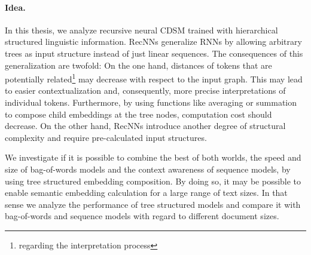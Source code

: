 \paragraph{Idea.}In this thesis, we analyze recursive neural \ac{CDSM} trained with hierarchical structured linguistic information. \acp{RecNN} \autocite{goller_learning_1996,socher_parsing_2011} generalize \acp{RNN} by allowing arbitrary trees as input structure instead of just linear sequences. The consequences of this generalization are twofold: On the one hand, distances of tokens that are potentially related\footnote{regarding the interpretation process} may decrease with respect to the input graph. This may lead to easier contextualization and, consequently, more precise interpretations of individual tokens. Furthermore, by using functions like averaging or summation to compose child embeddings at the tree nodes, computation cost should decrease. On the other hand, \acp{RecNN} introduce another degree of structural complexity and require pre-calculated input structures.%

We investigate if it is possible to combine the best of both worlds, the speed and size of bag-of-words models and the context awareness of sequence models, by using tree structured embedding composition. By doing so, it may be possible to enable semantic embedding calculation for a large range of text sizes. In that sense we analyze the performance of tree structured models and compare it with bag-of-words and sequence models with regard to different document sizes.

